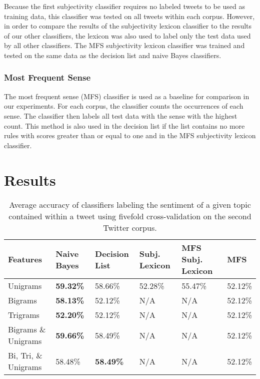 \documentclass[11pt]{article}
\begin{document}
\indent Because the first subjectivity classifier requires no labeled tweets to be used as training data, this classifier was tested on all tweets within each corpus. However, in order to compare the results of the subjectivity lexicon classifier to the results of our other classifiers, the lexicon was also used to label only the test data used by all other classifiers. The MFS subjectivity lexicon classifier was trained and tested on the same data as the decision list and naive Bayes classifiers. 

\subsubsection*{Most Frequent Sense}
The most frequent sense (MFS) classifier is used as a baseline for comparison in our experiments. For each corpus, the classifier counts the occurrences of each sense. The classifier then labels all test data with the sense with the highest count. This method is also used in the decision list if the list contains no more rules with scores greater than or equal to one and in the MFS subjectivity lexicon classifier.

\section{Results}
\begin{table*}[htb!]
  \centering
  \begin{tabular}{| l || l | l | l | l | l |}
  \hline
  Features & Naive Bayes & Decision List & Subj. Lexicon & MFS Subj. Lexicon & MFS \\ 
  \hline \hline
  Unigrams              & \bf{59.32}\%      & 58.66\% & 52.28\% & 55.47\% 
                        & 52.12\% \\  \hline
  Bigrams               & \bf{58.13}\%      & 52.12\%      & N/A          
                        & N/A          & 52.12\% \\  \hline
  Trigrams              & \bf{52.20}\%      & 52.12\%      & N/A          
                        & N/A          & 52.12\% \\  \hline
  Bigrams \& Unigrams   & \bf{59.66}\% & 58.49\%      & N/A          
           & N/A          & 52.12\% \\  \hline
  Bi, Tri, \& Unigrams  & 58.48\%      & \bf{58.49}\%      & N/A          
           & N/A          & 52.12\% \\  \hline
  \end{tabular}
  \caption{Average accuracy of classifiers labeling the sentiment of a given topic contained within a tweet using fivefold cross-validation on the second Twitter corpus.}
\end{table*}
\end{document}
